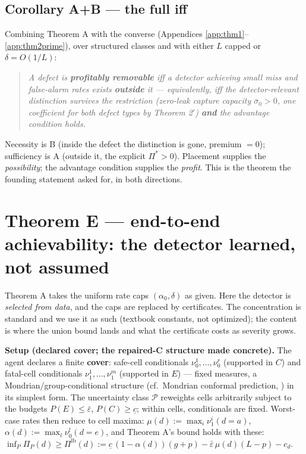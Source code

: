 \documentclass[11pt]{article}
\theoremstyle{plain}
\theoremstyle{definition}
\begin{document}
\subsection*{Corollary A+B --- the full iff}

Combining Theorem A with the converse (Appendices \ref{app:thm1}--\ref{app:thm2prime}), over structured classes and
with either $L$ capped or $\delta = O(1/L)$:

\begin{quote}\itshape
A defect is \textbf{profitably removable} iff a detector achieving small
miss and false-alarm rates exists \textbf{outside} it --- equivalently, iff the
detector-relevant distinction survives the restriction (zero-leak capture
capacity $\bar\sigma_0 > 0$, one coefficient for both defect types by
Theorem 2$'$) \textbf{and} the advantage condition holds.
\end{quote}

Necessity is B (inside the defect the distinction is gone, premium $= 0$);
sufficiency is A (outside it, the explicit $\Pi^* > 0$). Placement supplies
the \emph{possibility}; the advantage condition supplies the \emph{profit}. This is the
theorem the founding statement asked for, in both directions.

\section{Theorem E --- end-to-end achievability: the detector learned, not assumed}\label{app:thmE}

Theorem A takes the uniform rate caps $(\alpha_0, \delta)$ as given. Here the
detector is \emph{selected from data}, and the caps are replaced by certificates.
The concentration is standard and we use it as such (textbook constants, not
optimized); the content is where the union bound lands and what the
certificate costs as severity grows.

\textbf{Setup (declared cover; the repaired-C structure made concrete).} The
agent declares a finite \textbf{cover}: safe-cell conditionals
$\nu_0^1, \dots, \nu_0^r$ (supported in $C$) and fatal-cell conditionals
$\nu_1^1, \dots, \nu_1^m$ (supported in $E$) --- fixed measures, a
Mondrian/group-conditional structure (cf.\ Mondrian conformal prediction,
\citealt{vovk2005}) in its simplest
form. The uncertainty class $\mathcal{P}$ reweights cells arbitrarily subject
to the budgets $P(E) \leq \bar\varepsilon$, $P(C) \geq \underline c$; within
cells, conditionals are fixed. Worst-case rates then reduce to cell maxima:
$\mu(d) := \max_i \nu_1^i(d{=}a)$, $\alpha(d) := \max_l \nu_0^l(d{=}e)$, and
Theorem A's bound holds with these: $\inf_P \Pi_P(d) \geq \Pi^{\mathrm{lb}}(d)
:= \underline c\,(1-\alpha(d))(g+p) - \bar\varepsilon\,\mu(d)(L-p) - c_d$.
\end{document}
